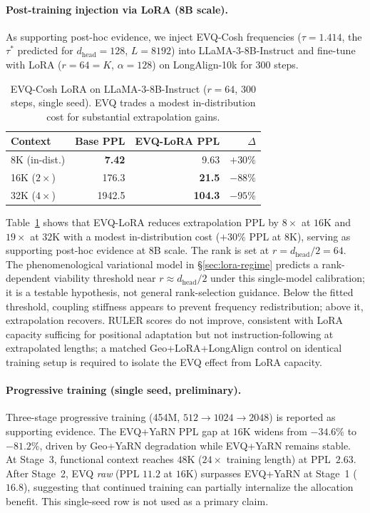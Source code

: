 \paragraph{Post-training injection via LoRA (8B scale).}
As supporting post-hoc evidence, we inject EVQ-Cosh frequencies ($\tau{=}1.414$, the $\tau^*$ predicted for $d_{\mathrm{head}}{=}128$, $L{=}8192$) into LLaMA-3-8B-Instruct \citep{grattafiori2024llama3} and fine-tune with LoRA ($r{=}64{=}K$, $\alpha{=}128$) on LongAlign-10k \citep{bai2024longalign} for 300 steps.

\begin{table}[ht]
\caption{EVQ-Cosh LoRA on LLaMA-3-8B-Instruct ($r{=}64$, 300 steps, single seed). EVQ trades a modest in-distribution cost for substantial extrapolation gains.}
\label{tab:lora-8b}
\centering
\small
\begin{tabular}{@{}l r r r@{}}
\toprule
Context & Base PPL & EVQ-LoRA PPL & $\Delta$ \\
\midrule
8K (in-dist.) & \textbf{7.42} & 9.63 & $+30\%$ \\
16K ($2\times$) & 176.3 & \textbf{21.5} & $-88\%$ \\
32K ($4\times$) & 1942.5 & \textbf{104.3} & $-95\%$ \\
\bottomrule
\end{tabular}
\end{table}

Table~\ref{tab:lora-8b} shows that EVQ-LoRA reduces extrapolation PPL by $8\times$ at $16\mathrm{K}$ and $19\times$ at $32\mathrm{K}$ with a modest in-distribution cost ($+30\%$ PPL at $8\mathrm{K}$), serving as supporting post-hoc evidence at 8B scale. The rank is set at $r{=}d_{\mathrm{head}}/2{=}64$. The phenomenological variational model in \S\ref{sec:lora-regime} predicts a rank-dependent viability threshold near $r \approx d_{\mathrm{head}}/2$ under this single-model calibration; it is a testable hypothesis, not general rank-selection guidance. Below the fitted threshold, coupling stiffness appears to prevent frequency redistribution; above it, extrapolation recovers. RULER scores do not improve, consistent with LoRA capacity sufficing for positional adaptation but not instruction-following at extrapolated lengths; a matched Geo+LoRA+LongAlign control on identical training setup is required to isolate the EVQ effect from LoRA capacity.

\paragraph{Progressive training (single seed, preliminary).}
Three-stage progressive training (454M, $512{\to}1024{\to}2048$) is reported as supporting evidence.
The EVQ+YaRN PPL gap at $16\mathrm{K}$ widens from $-34.6\%$ to $-81.2\%$, driven by Geo+YaRN degradation while EVQ+YaRN remains stable. At Stage~3, functional context reaches $48\mathrm{K}$ ($24\times$ training length) at PPL~$2.63$. After Stage~2, EVQ \emph{raw} (PPL $11.2$ at $16\mathrm{K}$) surpasses EVQ+YaRN at Stage~1 ($16.8$), suggesting that continued training can partially internalize the allocation benefit. This single-seed row is not used as a primary claim.

